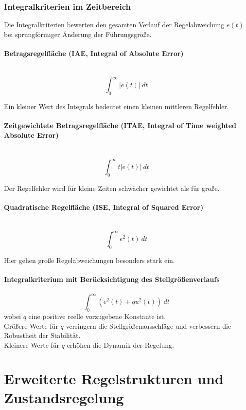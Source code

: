 \documentclass[10pt,a4paper]{article}
\begin{document}
\subsubsection{Integralkriterien im Zeitbereich}
Die Integralkriterien bewerten den gesamten Verlauf der Regelabweichung $e(t)$ bei sprungförmiger Änderung der Führungsgröße.

\paragraph{Betragsregelfläche (IAE, Integral of Absolute Error)} ~\\
$$
	\int_0^∞ |e(t)| ~dt
$$

Ein kleiner Wert des Integrals bedeutet einen kleinen mittleren Regelfehler.

\paragraph{Zeitgewichtete Betragsregelfläche (ITAE, Integral of Time weighted Absolute Error)} ~\\
$$
	\int_0^∞ t|e(t)| ~dt
$$

Der Regelfehler wird für kleine Zeiten schwächer gewichtet als für große.

\paragraph{Quadratische Regelfläche (ISE, Integral of Squared Error)} ~\\
$$
	\int_0^∞ e^2(t) ~dt
$$

Hier gehen große Regelabweichungen besonders stark ein.

\paragraph{Integralkriterium mit Berücksichtigung des Stellgrößenverlaufs}
$$
	\int_0^∞ (e^2(t) + qu^2(t)) ~dt
$$
wobei $q$ eine positive reelle vorzugebene Konstante ist. \\
Größere Werte für $q$ verringern die Stellgrößenausschläge und verbessern die Robustheit der Stabilität. \\
Kleinere Werte für $q$ erhöhen die Dynamik der Regelung.

\section{Erweiterte Regelstrukturen und Zustandsregelung}
\end{document}
